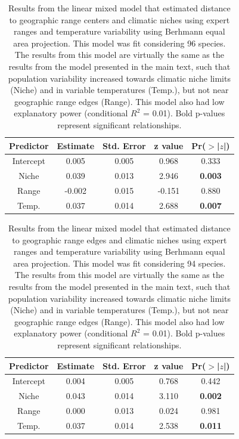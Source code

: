 \begin{table}[ht]
\centering
\caption[Expert mixed effect model results]{Results from the linear mixed model that estimated distance to geographic range centers and climatic niches using expert ranges and temperature variability using Berhmann equal area projection. This model was fit considering 96 species. The results from this model are virtually the same as the results from the model presented in the main text, such that population variability increased towards climatic niche limits (Niche) and in variable temperatures (Temp.), but not near geographic range edges (Range). This model also had low explanatory power (conditional $R^2$ = 0.01). Bold p-values represent significant relationships. } 
  \vspace*{3mm}
\begin{tabular}{ccccc}
  \hline
 Predictor & Estimate & Std. Error & z value & Pr($>$|$z$|) \\ 
  \hline
  Intercept & 0.005 & 0.005 & 0.968 & 0.333 \\ 
  Niche & 0.039 & 0.013 & 2.946 & \textbf{0.003} \\ 
  Range & -0.002 & 0.015 & -0.151 & 0.880 \\ 
  Temp. & 0.037 & 0.014 & 2.688 & \textbf{0.007} \\ 
   \hline
\end{tabular}
\label{tab:lmm_exp}
\end{table}

\begin{table}[H]
\centering
\caption[Edge mixed effect model results]{Results from the linear mixed model that estimated distance to geographic range edges and climatic niches using expert ranges and temperature variability using Berhmann equal area projection. This model was fit considering 94 species. The results from this model are virtually the same as the results from the model presented in the main text, such that population variability increased towards climatic niche limits (Niche) and in variable temperatures (Temp.), but not near geographic range edges (Range). This model also had low explanatory power (conditional $R^2$ = 0.01). Bold p-values represent significant relationships. } 
  \vspace*{3mm}
\begin{tabular}{ccccc}
  \hline
 Predictor & Estimate & Std. Error & z value & Pr($>$|$z$|) \\ 
  \hline
  Intercept & 0.004 & 0.005 & 0.768 & 0.442 \\ 
  Niche & 0.043 & 0.014 & 3.110 & \textbf{0.002} \\ 
  Range & 0.000 & 0.013 & 0.024 & 0.981 \\ 
  Temp. & 0.037 & 0.014 & 2.538 & \textbf{0.011} \\ 
   \hline
\end{tabular}
\label{tab:lmm_edge}
\end{table}

